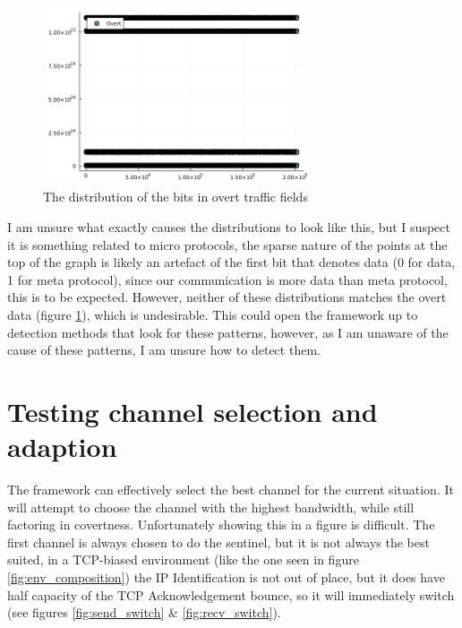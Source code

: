 \begin{figure}[h]
    \centering
    \includegraphics[width=0.7\textwidth]{fig/overt.png}
    \caption{The distribution of the bits in overt traffic fields}
    \label{fig:overt_field}
\end{figure}

I am unsure what exactly causes the distributions to look like this, but I suspect it is something related to micro protocols, the sparse nature of the points at the top of the graph is likely an artefact of the first bit that denotes data (0 for data, 1 for meta protocol), since our communication is more data than meta protocol, this is to be expected. However, neither of these distributions matches the overt data (figure \ref{fig:overt_field}), which is undesirable. This could open the framework up to detection methods that look for these patterns, however, as I am unaware of the cause of these patterns, I am unsure how to detect them.

\section{Testing channel selection and adaption}
\label{sec:channel_selection_and_adaption}

The framework can effectively select the best channel for the current situation. It will attempt to choose the channel with the highest bandwidth, while still factoring in covertness. Unfortunately showing this in a figure is difficult. The first channel is always chosen to do the sentinel, but it is not always the best suited, in a TCP-biased environment (like the one seen in figure \ref{fig:env_composition}) the IP Identification is not out of place, but it does have half capacity of the TCP Acknowledgement bounce, so it will immediately switch (see figures \ref{fig:send_switch} \& \ref{fig:recv_switch}).

